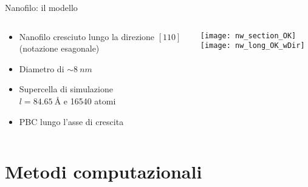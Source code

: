\documentclass{beamer}
\begin{document}
\begin{frame}{Nanofilo: il modello}
 \begin{columns}
  \begin{column}{0.5\textwidth}
    \begin{itemize}
      \item Nanofilo cresciuto lungo la {\ev direzione $[110]$}\\ (notazione esagonale)
      \item Diametro di $\sim \SI{8}{nm}$
      \item Supercella di simulazione \\ {\ev$l=\SI{84.65}{\angstrom}$} e {\ev\num{16540} atomi}
      \item PBC lungo l'asse di crescita
  \end{itemize}
  \end{column}
  \begin{column}{0.5\textwidth}
   \centering
   \texttt{[image: nw\_section\_OK]}\\[3pt]
   \texttt{[image: nw\_long\_OK\_wDir]}
  \end{column}
 \end{columns}
 \vspace{0.2cm}
 \centering
{}
\end{frame}





\section{Metodi computazionali}


\end{document}
